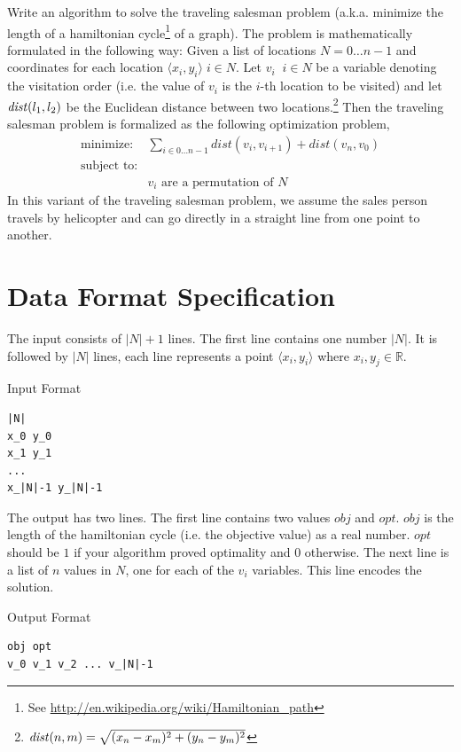 \documentclass[11pt]{article}
\begin{document}
Write an algorithm to solve the traveling salesman problem (a.k.a. minimize the length of a hamiltonian cycle\footnote{See \url{http://en.wikipedia.org/wiki/Hamiltonian_path}} of a graph).  The problem is mathematically formulated in the following way:  Given a list of locations $N = 0 \ldots n-1$ and coordinates for each location $\langle x_i,y_i \rangle \; i \in N$.  Let $v_i \;\; i \in N$ be a variable denoting the visitation order (i.e. the value of $v_i$ is the $i$-th location to be visited) and let ${\it dist}(l_1,l_2)$ be the Euclidean distance between two locations.\footnote{${\it dist}(n,m) = \sqrt{(x_{n} - x_{m})^2 + (y_{n} - y_{m})^2}$}  Then the traveling salesman problem is formalized as the following optimization problem,
$$
\begin{array}{ll}
\mbox{minimize:} & \displaystyle \sum_{i \in 0 \ldots n-1} dist(v_i,v_{i+1}) + dist(v_n,v_{0}) \\
\mbox{subject to:} & \\
     & v_i\mbox{ are a permutation of } N 
\end{array}
$$
In this variant of the traveling salesman problem, we assume the sales person travels by helicopter and can go directly in a straight line from one point to another.

\section{Data Format Specification}

The input consists of $|N| + 1$ lines.  The first line contains one number $|N|$.
It is followed by $|N|$ lines, each line represents a point $\langle x_i, y_i \rangle$ where $x_i, y_j \in \mathbb{R}$.

\vspace{0.2cm}
\noindent
Input Format
\vspace{-0.2cm}
\begin{Verbatim}[frame=single]
|N| 
x_0 y_0
x_1 y_1
...
x_|N|-1 y_|N|-1
\end{Verbatim}
%
The output has two lines.  The first line contains two values $obj$ and $opt$.  $obj$ is the length of the hamiltonian cycle (i.e. the objective value) as a real number.  $opt$ should be $1$ if your algorithm proved optimality and $0$ otherwise.  The next line is a list of $n$ values in $N$, one for each of the $v_i$ variables.  This line encodes the solution.

\vspace{0.2cm}
\noindent
Output Format
\vspace{-0.2cm}
\begin{Verbatim}[frame=single]
obj opt
v_0 v_1 v_2 ... v_|N|-1
\end{Verbatim}
%
\end{document}
